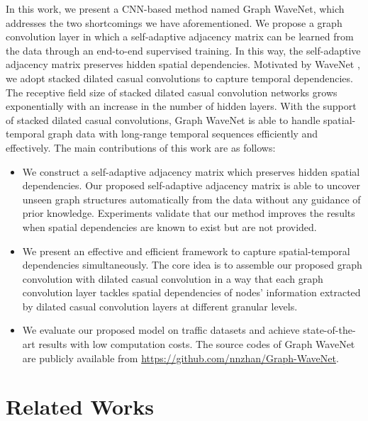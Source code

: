 In this work, we present a CNN-based method named Graph WaveNet, which addresses the two shortcomings we have aforementioned. We propose a graph convolution layer in which a self-adaptive adjacency matrix can be learned from the data through an end-to-end supervised training. In this way, the self-adaptive adjacency matrix preserves hidden spatial dependencies. Motivated by WaveNet \cite{oord2016wavenet}, we adopt stacked dilated casual convolutions to capture temporal dependencies. The receptive field size of stacked dilated casual convolution networks grows exponentially with an increase in the number of hidden layers. With the support of stacked dilated casual convolutions, Graph WaveNet is able to handle spatial-temporal graph data with long-range temporal sequences efficiently and effectively. The main contributions of this work are as follows:

\begin{itemize}
    \item We construct a self-adaptive adjacency matrix which preserves hidden spatial dependencies. Our proposed self-adaptive adjacency matrix is able to uncover unseen graph structures automatically from the data without any guidance of prior knowledge. Experiments validate that our method improves the results when spatial dependencies are known to exist but are not provided.
    \item We present an effective and efficient framework to capture spatial-temporal dependencies simultaneously. The core idea is to assemble our proposed graph convolution with dilated casual convolution in a way that each graph convolution layer tackles spatial dependencies of nodes' information extracted by dilated casual convolution layers at different granular levels.   

    \item We evaluate our proposed model on traffic datasets and achieve state-of-the-art results with low computation costs.
    The source codes of Graph WaveNet are publicly available from \url{https://github.com/nnzhan/Graph-WaveNet}.
\end{itemize}

\section{Related Works}
